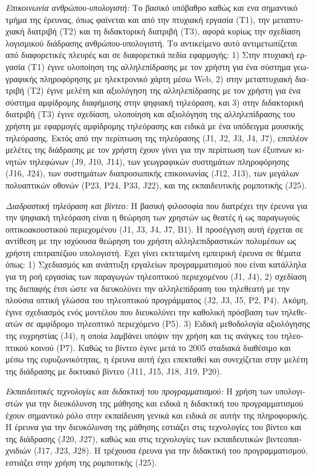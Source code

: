 \documentclass[11pt, a4paper]{article}
\begin{document}
\begin{greek}
\emph{Επικοινωνία ανθρώπου-υπολογιστή:} Το βασικό υπόβαθρο καθώς και ενα
σημαντικό τμήμα της έρευνας, όπως φαίνεται και από την πτυχιακή εργασία
(Τ1), την μεταπτυχιακή διατριβή (Τ2) και τη διδακτορική διατριβή (Τ3),
αφορά κυρίως την σχεδίαση λογισμικού διάδρασης ανθρώπου-υπολογιστή. Το
αντικείμενο αυτό αντιμετωπίζεται από διαφορετικές πλευρές και σε
διαφορετικά πεδία εφαρμογής: 1) Στην πτυχιακή εργασία (Τ1) έγινε
υλοποίηση της αλληλεπίδρασης με τον χρήστη για ένα σύστημα γεωγραφικής
πληροφόρησης με ηλεκτρονικό χάρτη μέσω Web, 2) στην μεταπτυχιακή
διατριβή (Τ2) έγινε μελέτη και αξιολόγηση της αλληλεπίδρασης με τον
χρήστη για ένα σύστημα αμφίδρομης διαφήμισης στην ψηφιακή τηλεόραση, και
3) στην διδακτορική διατριβή (Τ3) έγινε σχεδίαση, υλοποίηση και
αξιολόγηση της αλληλεπίδρασης του χρήστη με εφαρμογές αμφίδρομης
τηλεόρασης και ειδικά με ένα υπόδειγμα μουσικής τηλεόρασης. Εκτός από
την περίπτωση της τηλεόρασης (J1, J2, J3, J4, J7), επιπλέον μελέτες της
διάδρασης με τον χρήστη έχουν γίνει για την περίπτωση των έξυπνων
κινητών τηλεφώνων (J9, J10, J14), των γεωγραφικών συστημάτων
πληροφόρησης (J16, J24), των συστημάτων διαπροσωπικής επικοινωνίας (J12,
J13), των μεγάλων πολυαπτικών οθονών (P23, P24, P33, J22), και της
εκπαιδευτικής ρομποτικής (J25).

\emph{Διαδραστική τηλεόραση και βίντεο:} Η βασική φιλοσοφία που
διατρέχει την έρευνα για την ψηφιακή τηλεόραση είναι η θεώρηση των
χρηστών ως θεατές ή ως παραγωγούς οπτικοακουστικού περιεχομένου (J1, J3,
J4, J7, B1). Η προσέγγιση αυτή έρχεται σε αντίθεση με την ισχύουσα
θεώρηση του χρήστη αλληλεπιδραστικών πολυμέσων ως χρήστη επιτραπέζιου
υπολογιστή. Εχει γίνει εκτεταμένη εμπειρική έρευνα σε θέματα όπως: 1)
Σχεδιασμός και ανάπτυξη εργαλείων προγραμματισμού που είναι κατάλληλα
για τη ροή εργασίας των παραγωγών τηλεοπτικού περιεχομένου (J1, J4), 2)
σχεδίαση της διεπαφής έτσι ώστε να διευκολύνει την αλληλεπίδραση του
τηλεθεατή με την πλούσια οπτική γλώσσα του τηλεοπτικού προγράμματος (J2,
J3, J5, P2, P4). Ακόμη, έγινε σχεδιασμός ενός μοντέλου που διευκολύνει
την καθολική πρόσβαση των τηλεθεατών σε αμφίδρομο τηλεοπτικό περιεχόμενο
(P5). 3) Ειδική μεθοδολογία αξιολόγησης της ευχρηστίας (J4), η οποία
λαμβάνει υπόψιν την χρήση και τις ανάγκες του τηλεοπτικού κοινού (P7).
Καθώς το βίντεο έγινε μετά το 2005 σταδιακά διαθέσιμο και μέσω της
ευρυζωνικότητας, η έρευνα αυτή έχει επεκταθεί και συνεχίζεται στην
μελέτη της διάδρασης με δικτυακό βίντεο (J11, J15, J18, J19, P20).

\emph{Εκπαιδευτικές τεχνολογίες και διδακτική του προγραμματισμού:} Η
χρήση των υπολογιστών για την διευκόλυνση της μάθησης και ειδικά η
διδακτική του προγραμματισμού έχουν σημαντικό ρόλο στην εκπαίδευση
γενικά και ειδικά σε αυτήν της πληροφορικής. Η έρευνα για την
διευκόλυνση της μάθησης εστιάζει στις τεχνολογίες του βίντεο και της
διάδρασης (J20, J27), καθώς και στις τεχνολογίες των εκπαιδευτικών
βιντεοπαιχνιδιών (J17, J23, J28). Η τρέχουσα έρευνα για την διδακτική
του προγραμματισμού, εστιάζει στην χρήση της ρομποτικής (J25).


\end{greek}
\end{document}
